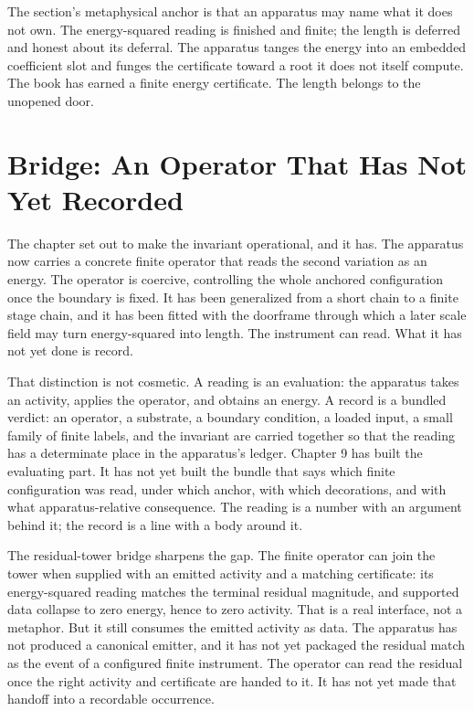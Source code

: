 The section's metaphysical anchor is that an apparatus may name what it does not
own. The energy-squared reading is finished and finite; the length is deferred
and honest about its deferral. The apparatus tanges the energy into an embedded
coefficient slot and funges the certificate toward a root it does not itself
compute. The book has earned a finite energy certificate. The length belongs to
the unopened door.

\section*{Bridge: An Operator That Has Not Yet Recorded}

The chapter set out to make the invariant operational, and it has. The apparatus
now carries a concrete finite operator that reads the second variation as an
energy. The operator is coercive, controlling the whole anchored configuration
once the boundary is fixed. It has been generalized from a short chain to a finite
stage chain, and it has been fitted with the doorframe through which a later scale
field may turn energy-squared into length. The instrument can read. What it has
not yet done is record.

That distinction is not cosmetic. A reading is an evaluation: the apparatus takes
an activity, applies the operator, and obtains an energy. A record is a bundled
verdict: an operator, a substrate, a boundary condition, a loaded input, a small
family of finite labels, and the invariant are carried together so that the
reading has a determinate place in the apparatus's ledger. Chapter 9 has built
the evaluating part. It has not yet built the bundle that says which finite
configuration was read, under which anchor, with which decorations, and with what
apparatus-relative consequence. The reading is a number with an argument behind it;
the record is a line with a body around it.

The residual-tower bridge sharpens the gap. The finite operator can join the
tower when supplied with an emitted activity and a matching certificate: its
energy-squared reading matches the terminal residual magnitude, and supported
data collapse to zero energy, hence to zero activity. That is a real interface,
not a metaphor. But it still consumes the emitted activity as data. The apparatus
has not produced a canonical emitter, and it has not yet packaged the residual
match as the event of a configured finite instrument. The operator can read the
residual once the right activity and certificate are handed to it. It has not yet
made that handoff into a recordable occurrence.

